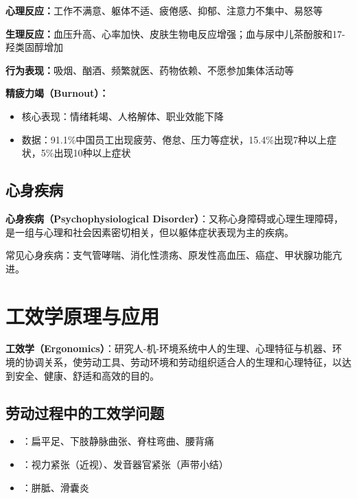 \begin{keybox}
\textbf{心理反应：}工作不满意、躯体不适、疲倦感、抑郁、注意力不集中、易怒等

\textbf{生理反应：}血压升高、心率加快、皮肤生物电反应增强；血与尿中儿茶酚胺和17-羟类固醇增加

\textbf{行为表现：}吸烟、酗酒、频繁就医、药物依赖、不愿参加集体活动等

\textbf{精疲力竭（Burnout）：}
\begin{itemize}[leftmargin=*]
    \item 核心表现：情绪耗竭、人格解体、职业效能下降
    \item 数据：91.1\%中国员工出现疲劳、倦怠、压力等症状，15.4\%出现7种以上症状，5\%出现10种以上症状
\end{itemize}
\end{keybox}

\subsection{心身疾病}

\begin{defbox}
\textbf{心身疾病（Psychophysiological Disorder）}：又称心身障碍或心理生理障碍，是一组与心理和社会因素密切相关，但以躯体症状表现为主的疾病。

常见心身疾病：支气管哮喘、消化性溃疡、原发性高血压、癌症、甲状腺功能亢进。
\end{defbox}

\section{工效学原理与应用}

\begin{defbox}
\textbf{工效学（Ergonomics）}：研究人-机-环境系统中人的生理、心理特征与机器、环境的协调关系，使劳动工具、劳动环境和劳动组织适合人的生理和心理特征，以达到安全、健康、舒适和高效的目的。
\end{defbox}

\subsection{劳动过程中的工效学问题}

\begin{itemize}[leftmargin=*]
    \item {}：扁平足、下肢静脉曲张、脊柱弯曲、腰背痛
    \item {}：视力紧张（近视）、发音器官紧张（声带小结）
    \item {}：胼胝、滑囊炎
\end{itemize}

